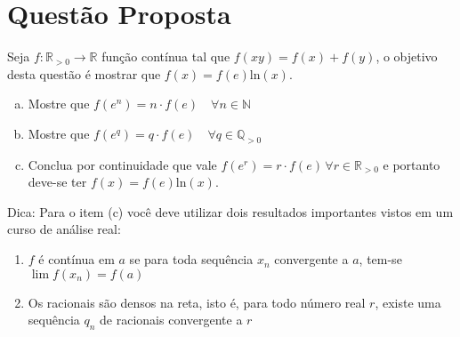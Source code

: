 \section{Questão Proposta}

Seja $f:\mathbb{R}_{>0} \to \mathbb{R}$ função contínua tal que $f(xy) = f(x) + f(y)$, o objetivo desta questão é mostrar que $f(x) = f(e)\text{ln}(x)$.
\begin{enumerate}[(a)]
    \item Mostre que $f(e^n) = n\cdot f(e) \quad \forall n \in \mathbb{N}$
    \item Mostre que $f(e^q) = q\cdot f(e) \quad \forall q \in \mathbb{Q}_{>0}$
    \item Conclua por continuidade que vale $f(e^r) = r\cdot f(e) \, \forall r \in \mathbb{R}_{>0}$ e portanto deve-se ter $f(x) = f(e) \text{ln}(x)$.
\end{enumerate}

\noindent Dica: Para o item (c) você deve utilizar dois resultados importantes vistos em um curso de análise real:
\begin{enumerate}
    \item $f$ é contínua em $a$ se para toda sequência $x_n$ convergente a $a$, tem-se $\lim f(x_n) = f(a)$
    \item Os racionais são densos na reta, isto é, para todo número real $r$, existe uma sequência $q_n$ de racionais convergente a $r$
\end{enumerate}
